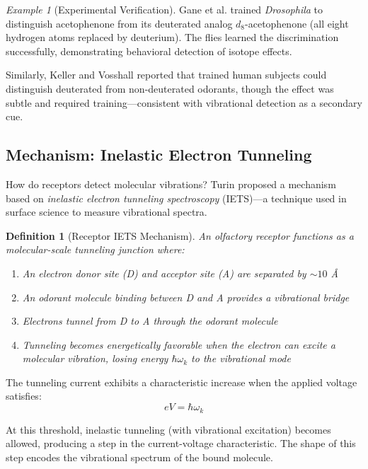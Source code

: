 \documentclass[11pt]{article}
\newtheorem{definition}[theorem]{Definition}
\theoremstyle{remark}
\newtheorem{example}[theorem]{Example}
\begin{document}
\begin{example}[Experimental Verification]
Gane et al. \cite{gane2013molecular} trained \textit{Drosophila} to distinguish acetophenone from its deuterated analog $d_8$-acetophenone (all eight hydrogen atoms replaced by deuterium). The flies learned the discrimination successfully, demonstrating behavioral detection of isotope effects.

Similarly, Keller and Vosshall \cite{keller2004human} reported that trained human subjects could distinguish deuterated from non-deuterated odorants, though the effect was subtle and required training—consistent with vibrational detection as a secondary cue.
\end{example}

\subsection{Mechanism: Inelastic Electron Tunneling}

How do receptors detect molecular vibrations? Turin proposed a mechanism based on \textit{inelastic electron tunneling spectroscopy} (IETS)—a technique used in surface science to measure vibrational spectra.

\begin{definition}[Receptor IETS Mechanism]
\label{def:ietsp}
An olfactory receptor functions as a molecular-scale tunneling junction where:
\begin{enumerate}
\item An electron donor site (D) and acceptor site (A) are separated by $\sim 10$ Å
\item An odorant molecule binding between D and A provides a vibrational bridge
\item Electrons tunnel from D to A through the odorant molecule
\item Tunneling becomes energetically favorable when the electron can excite a molecular vibration, losing energy $\hbar\omega_k$ to the vibrational mode
\end{enumerate}
\end{definition}

The tunneling current exhibits a characteristic increase when the applied voltage satisfies:
\begin{equation}
eV = \hbar\omega_k
\end{equation}

At this threshold, inelastic tunneling (with vibrational excitation) becomes allowed, producing a step in the current-voltage characteristic. The shape of this step encodes the vibrational spectrum of the bound molecule.
\end{document}
